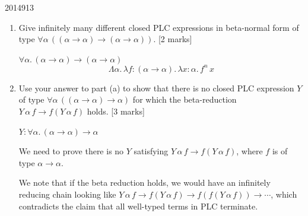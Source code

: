 \documentclass[10pt,\jkfside,a4paper]{article}
\newcommand{\answer}[1]{
    \begin{tcolorbox}[colframe=black, colback=white, sharp corners, boxrule=0.2mm, breakable]
        #1
    \end{tcolorbox}
}
\newcommand{\qmarks}[1]{\hspace*{\fill}[#1]}
\begin{document}
\begin{examquestion}{2014}{9}{13}
\begin{enumerate}
{                In the second typing, we again see something similar, so we note that $\tau$ will be of type $\alpha \to \beta \to \gamma$.
            }

        \item
            Give infinitely many different closed PLC expressions in beta-normal form of
            type $\forall \alpha\, ((\alpha \to \alpha) \to (\alpha \to \alpha))$.
            \qmarks{2 marks}

            \answer{
                $\forall \alpha.\, (\alpha \to \alpha) \to (\alpha \to \alpha)$
                \[
                    \Lambda \alpha.\, \lambda f : (\alpha \to \alpha).\, \lambda x : \alpha.\, f^n\,x
                \]
            }

        \item
            Use your answer to part (a) to show that there is no closed PLC expression
            $Y$ of type $\forall \alpha\, ((\alpha \to \alpha) \to \alpha)$ for which the
            beta-reduction $Y\,\alpha\,f \to f(Y\,\alpha\,f)$ holds. \qmarks{3 marks}

            \answer{
                $Y : \forall \alpha.\, (\alpha \to \alpha) \to \alpha$

                We need to prove there is no $Y$ satisfying $Y\,\alpha\,f \to f(Y\,\alpha\,f)$, where $f$ is of type $\alpha \to \alpha$.

                We note that if the beta reduction holds, we would have an infinitely reducing chain looking like $Y\,\alpha\,f \to f(Y\,\alpha\,f) \to f ( f (Y\, \alpha\, f)) \to \cdots$, which contradicts the claim that all well-typed terms in PLC terminate. 
            }

    \end{enumerate}

\end{examquestion}
\end{document}

